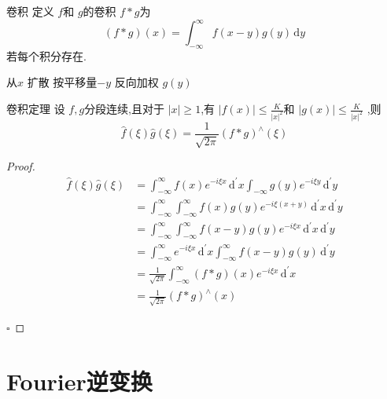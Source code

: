 \documentclass[../../PDE.tex]{subfiles}
\begin{document}
\begin{definition}{卷积}
    定义 \(  f  \)和 \(  g  \)的卷积 \(  f*g  \)为 \[
    \left( f*g \right)\left( x \right)  = \int_{-\infty}^{\infty}f\left( x-y \right)g\left( y \right)\,\mathrm{d} y  
    \]若每个积分存在.   
\end{definition}
\begin{note}
    从\(  x  \) 扩散 按平移量\(  -y  \) 反向加权 \(  g\left( y \right)   \) 
\end{note}
\begin{theorem}{卷积定理}
    设 \(  f,g  \)分段连续,且对于 \(  \left| x \right|\ge 1   \),有 \(  \left| f\left( x \right)  \right|\le \frac{K }{\left| x \right|^{2}  }    \)和 \(  \left| g\left( x \right)  \right|\le \frac{K }{\left| x \right|^{2}  }    \)    ,则 \[
    \hat{f}\left(  \xi  \right)\hat{g}\left(  \xi  \right)= \frac{1 }{\sqrt{2\pi } } \left( f*g \right)^{\wedge }\left(  \xi  \right)     
    \]
\end{theorem}
\begin{proof}
    \[
    \begin{aligned}
    \hat{f}\left(  \xi  \right)\hat{g}\left(  \xi  \right)&= \int_{-\infty}^{\infty} f\left( x \right)    e^{-i \xi x}\,\mathrm{d} ^{\prime} x \int_{-\infty}g\left( y \right)e^{-i \xi y}\,\mathrm{d} ^{\prime} y\\ 
     &= \int_{-\infty}^{\infty}\int_{-\infty}^{\infty}f\left( x \right)g\left( y \right)e^{-i \xi \left( x+ y \right) }\,\mathrm{d} ^{\prime} x\,\mathrm{d} ^{\prime} y   \\ 
      &= \int_{-\infty}^{\infty}\int_{-\infty}^{\infty}f\left( x-y \right)g\left( y \right)e^{-i \xi x}\,\mathrm{d} ^{\prime} x\,\mathrm{d} ^{\prime} y\\ 
       &= \int_{-\infty}^{\infty}e^{-i \xi x}\,\mathrm{d} ^{\prime} x \int_{-\infty}^{\infty}f\left( x-y \right)g\left( y \right)\,\mathrm{d} ^{\prime} y  \\ 
        &= \frac{1 }{\sqrt{2\pi } } \int_{-\infty}^{\infty}\left( f*g \right)\left(  x  \right)e^{-i \xi x}\,\mathrm{d} ^{\prime} x \\ 
         &= \frac{1 }{\sqrt{2\pi }  } \left( f*g \right)    ^{\wedge }\left( x \right) 
    \end{aligned}
    \]

    \hfill $\square$
\end{proof}

\section{Fourier逆变换}
\end{document}
